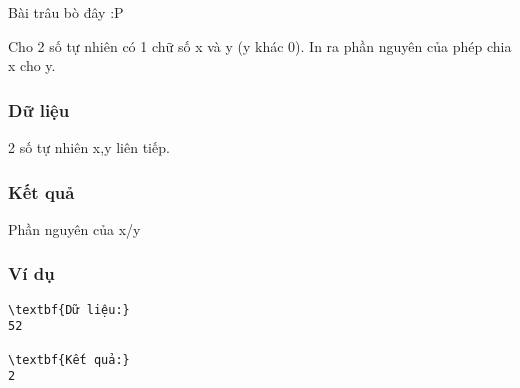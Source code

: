 



   Bài trâu bò đây :P  

   Cho 2 số tự nhiên có 1 chữ số x và y (y khác 0). In ra phần nguyên của phép chia x cho y.  

\subsubsection{   Dữ liệu  }

   2 số tự nhiên x,y liên tiếp.  

\subsubsection{   Kết quả  }

   Phần nguyên của x/y  

\subsubsection{   Ví dụ  }
\begin{verbatim}
\textbf{Dữ liệu:}
52

\textbf{Kết quả:}
2
\end{verbatim}